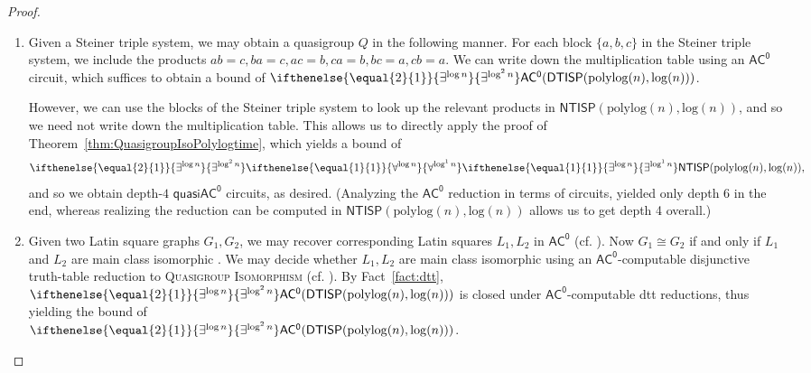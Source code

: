 \documentclass{article}
\newcommand{\algprobm}[1]{\textsc{#1}\xspace}
\newcommand{\betacc}[1]{\ifthenelse{\equal{#1}{1}}{\exists^{\log n}}{\exists^{\log^{#1}n}}} %
\newcommand{\alphacc}[1]{\ifthenelse{\equal{#1}{1}}{\forall^{\log n}}{\forall^{\log^{#1}n}}} %
\newcommand*{\ComplexityClass}[1]{\ensuremath{\mathsf{#1}}\xspace}
\newcommand{\NTISP}{\ComplexityClass{NTISP}}
\newcommand{\DTISP}{\ComplexityClass{DTISP}}
\newcommand{\NTISPpll}{\ensuremath{\NTISP(\mathrm{polylog}(n),\mathrm{log}(n))}\xspace}
\newcommand{\DTISPpll}{\ensuremath{\DTISP(\mathrm{polylog}(n),\mathrm{log}(n))}\xspace}
\newcommand{\ACz}{\ComplexityClass{AC^0}}
\newcommand{\qACz}{\ComplexityClass{quasiAC^0}}
\begin{document}
\begin{proof}
\begin{enumerate}[label=(\alph*)]
We can check in $\DTISPpll$ whether $g' h' = \ell'$. Similar to the proof of Theorem~\ref{thm:QuasigroupIsoPolylogtime}, we can combine the two $\alphacc{1}$ blocks into one $\alphacc{1}$ block, as the check whether $(\bar{a}, \bar{b}, \bar{c}) \mapsto (\bar{a'}, \bar{b'}, \bar{c'})$ preserves the quasigroup operation (the \emph{homotopism} condition) is independent of whether each of $\bar{a}, \bar{b}, \bar{c}$ generates $Q_1$, and each of $\bar{a'}, \bar{b'}, \bar{c'}$ generates $Q_2$. 

By Fact~\ref{fact:NTISP}, an $\NTISPpll$ machine can be simulated by a depth-$2$ $\qACz$ circuit, taking care of the final $\betacc{1}\DTISPpll$. The additional quantifiers $\betacc{2}\alphacc{1}$ then yield depth-$4$ $\qACz$ circuits. 

\item Given a Steiner triple system, we may obtain a quasigroup $Q$ in the following manner. For each block $\{a,b,c\}$ in the Steiner triple system, we include the products $ab = c, ba = c, ac = b, ca = b, bc = a, cb = a$. We can write down the multiplication table using an $\ACz$ circuit, which suffices to obtain a bound of $\betacc{2}\ACz(\DTISPpll)$. 

However, we can use the blocks of the Steiner triple system to look up the relevant products in $\NTISPpll$, and so we need not write down the multiplication table. This allows us to directly apply the proof of Theorem~\ref{thm:QuasigroupIsoPolylogtime}, which yields a bound of 
\[
\betacc{2}\alphacc{1}\betacc{1}\NTISPpll,
\]
and so we obtain depth-$4$ $\qACz$ circuits, as desired. (Analyzing the $\ACz$ reduction in terms of circuits, yielded only depth 6 in the end, whereas realizing the reduction can be computed in $\NTISPpll$ allows us to get depth 4 overall.)

\item Given two Latin square graphs $G_{1}, G_{2}$, we may recover corresponding Latin squares $L_{1}, L_{2}$ in $\ACz$ (cf. \cite[Lemma~3.9]{LevetLatinSquares}). Now $G_{1} \cong G_{2}$ if and only if $L_{1}$ and $L_{2}$ are main class isomorphic \cite[Lemma~3]{MillerTarjan}. We may decide whether $L_{1}, L_{2}$ are main class isomorphic using an $\ACz$-computable disjunctive truth-table reduction to \algprobm{Quasigroup Isomorphism} (cf. \cite[Remark~1.6]{LevetLatinSquares}). By Fact~\ref{fact:dtt},  $\betacc{2}\ACz(\DTISPpll)$ is closed under $\ACz$-computable dtt reductions, thus yielding the bound of \\$\betacc{2}\ACz(\DTISPpll)$.



\end{enumerate}
\end{proof}
\end{document}

